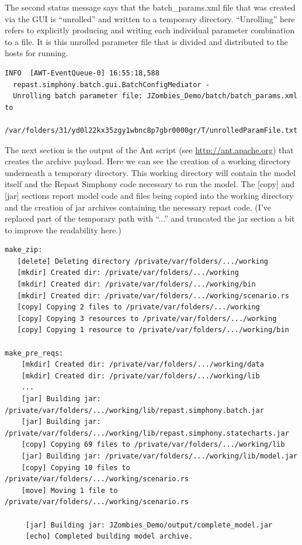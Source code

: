 \documentclass[11pt]{amsart}
\begin{document}
The second status message says that the batch\_params.xml file that was created via the GUI is ``unrolled'' and written to a temporary directory. ``Unrolling'' here refers to explicitly producing and writing each individual parameter combination to a file. It is this unrolled parameter file that is divided and distributed to the hosts for running. 

\begin{verbatim}
INFO  [AWT-EventQueue-0] 16:55:18,588 
  repast.simphony.batch.gui.BatchConfigMediator - 
  Unrolling batch parameter file: JZombies_Demo/batch/batch_params.xml to
  /var/folders/31/yd0l22kx35zgy1wbnc8p7gbr0000gr/T/unrolledParamFile.txt
\end{verbatim}

The next section is the output of the Ant script (see \href{http://ant.apache.org}{http://ant.apache.org}) that creates the archive payload. Here we can see the creation of a working directory underneath a temporary directory. This working directory will contain the model itself and the Repast Simphony code necessary to run the model.  The [copy] and [jar] sections report model code and files being copied into the working directory and the creation of jar archives containing the necessary repast code. (I've replaced part of the temporary path with ``...'' and truncated the jar section a bit to improve the readability here.)

\begin{verbatim}
make_zip:
   [delete] Deleting directory /private/var/folders/.../working
   [mkdir] Created dir: /private/var/folders/.../working
   [mkdir] Created dir: /private/var/folders/.../working/bin
   [mkdir] Created dir: /private/var/folders/.../working/scenario.rs
   [copy] Copying 2 files to /private/var/folders/.../working
   [copy] Copying 3 resources to /private/var/folders/.../working
   [copy] Copying 1 resource to /private/var/folders/.../working/bin
 
make_pre_reqs:
    [mkdir] Created dir: /private/var/folders/.../working/data
    [mkdir] Created dir: /private/var/folders/.../working/lib
    ...
    [jar] Building jar: /private/var/folders/.../working/lib/repast.simphony.batch.jar
    [jar] Building jar: /private/var/folders/.../working/lib/repast.simphony.statecharts.jar
    [copy] Copying 69 files to /private/var/folders/.../working/lib
    [jar] Building jar: /private/var/folders/.../working/lib/model.jar
    [copy] Copying 10 files to /private/var/folders/.../working/scenario.rs
    [move] Moving 1 file to /private/var/folders/.../working/scenario.rs

     [jar] Building jar: JZombies_Demo/output/complete_model.jar
     [echo] Completed building model archive.
\end{verbatim}
\end{document}
